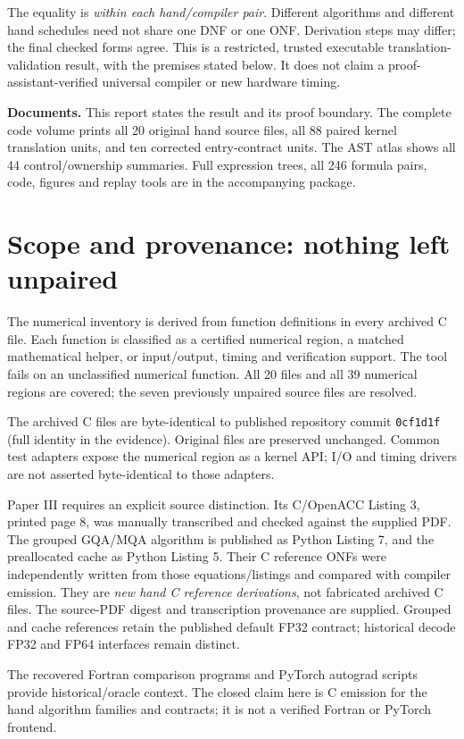 The equality is \emph{within each hand/compiler pair}. Different algorithms and
different hand schedules need not share one DNF or one ONF. Derivation steps may
differ; the final checked forms agree. This is a restricted, trusted executable
translation-validation result, with the premises stated below. It does not
claim a proof-assistant-verified universal compiler or new hardware timing.

\textbf{Documents.} This report states the result and its proof boundary. The
complete code volume prints all 20 original hand source files, all 88 paired
kernel translation units, and ten corrected entry-contract units. The AST atlas
shows all 44 control/ownership summaries. Full expression trees, all 246 formula
pairs, code, figures and replay tools are in the accompanying package.

\newpage\section{Scope and provenance: nothing left unpaired}
The numerical inventory is derived from function definitions in every archived
C file. Each function is classified as a certified numerical region, a matched
mathematical helper, or input/output, timing and verification support. The tool
fails on an unclassified numerical function. All 20 files and all 39 numerical
regions are covered; the seven previously unpaired source files are resolved.

The archived C files are byte-identical to published repository commit
\texttt{0cf1d1f} (full identity in the evidence). Original files are preserved
unchanged. Common test adapters expose the numerical region as a kernel API;
I/O and timing drivers are not asserted byte-identical to those adapters.

Paper III requires an explicit source distinction. Its C/OpenACC Listing 3,
printed page 8, was manually transcribed and checked against the supplied PDF.
The grouped GQA/MQA algorithm is published as Python Listing 7, and the
preallocated cache as Python Listing 5. Their C reference ONFs were independently
written from those equations/listings and compared with compiler emission.
They are \emph{new hand C reference derivations}, not fabricated archived C files.
The source-PDF digest and transcription provenance are supplied. Grouped and
cache references retain the published default FP32 contract; historical decode
FP32 and FP64 interfaces remain distinct.

The recovered Fortran comparison programs and PyTorch autograd scripts provide
historical/oracle context. The closed claim here is C emission for the hand
algorithm families and contracts; it is not a verified Fortran or PyTorch frontend.

